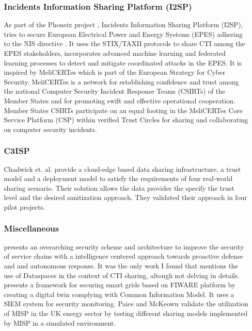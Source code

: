 \subsubsection{Incidents Information Sharing Platform (I2SP)} 
As part of the Phoneix project \cite{phoenix}, Incidents Information Sharing Platform (I2SP), tries to secure European Electrical Power and Energy Systems (EPES) adhering to the NIS directive \cite{skias_pan-european_2021}. It uses the STIX/TAXII protocols to share CTI among the EPES stakeholders, incorporates advanced machine learning and federated learning processes to detect and mitigate coordinated attacks in the EPES. It is inspired by MeliCERTes \cite{noauthor_melicertescsp_2024} which is part of the European Strategy for Cyber Security.  MeliCERTes is a network for establishing confidence and trust among the national Computer Security Incident Response Teams (CSIRTs) of the Member States and for promoting swift and effective operational cooperation. Member States CSIRTs participate on an equal footing in the MeliCERTes Core Service Platform (CSP) within verified Trust Circles for sharing and collaborating on computer security incidents. \cite{noauthor_melicertescsp_2024}
\subsubsection{C3ISP} Chadwick et. al. \cite{chadwick_cloud-edge_2020} provide a   cloud-edge based data sharing infrastructure, a trust model and a deployment model to satisfy the requirements of four real-world sharing scenario. Their solution allows the data provider the specify the trust level and the desired sanitization approach. They validated their approach in four pilot projects.
\subsubsection{Miscellaneous}
\cite{repetto_adaptive_2023} presents an overarching security scheme and architecture to improve the security of service chains with a intelligence centered approach towards proactive defense and and autonomous response. It was the only work I found that mentions the use of Dataspaces in the context of CTI sharing, altough not delving in details. \cite{coppolino_building_2023} presents a framework for securing smart grids based on FIWARE platform by creating a digital twin complying with Common Information Model. It uses a SIEM system for security monitoring.
Paice and McKeown \cite{paice_practical_2023} validate the utilization of MISP in the UK energy sector by testing different sharing models implemented by MISP in a simulated environment. 
